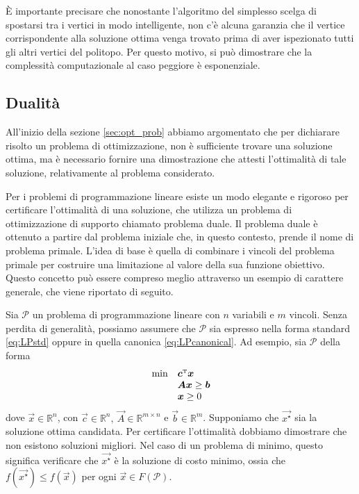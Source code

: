 \`E importante precisare che nonostante l'algoritmo del simplesso scelga di spostarsi tra i vertici in modo
intelligente, non c'è alcuna garanzia che il vertice corrispondente alla soluzione ottima venga trovato prima di aver
ispezionato tutti gli altri vertici del politopo. Per questo motivo, si può dimostrare che la complessità computazionale
al caso peggiore è esponenziale.

\subsection{Dualità}\label{sec:lpduality}
All'inizio della sezione \ref{sec:opt_prob} abbiamo argomentato che per dichiarare risolto un problema di
ottimizzazione, non è sufficiente trovare una soluzione ottima, ma è necessario fornire una dimostrazione
che attesti l'ottimalità di tale soluzione, relativamente al problema considerato.

Per i problemi di programmazione lineare esiste un modo elegante e rigoroso per certificare l'ottimalità di una
soluzione, che utilizza un problema di ottimizzazione di supporto chiamato problema duale. Il problema duale è ottenuto
a partire dal problema iniziale che, in questo contesto, prende il nome di problema primale. L'idea di base è quella di
combinare i vincoli del problema primale per costruire una limitazione al valore della sua funzione obiettivo. Questo
concetto può essere compreso meglio attraverso un esempio di carattere generale, che viene riportato di seguito.

Sia $\mathcal{P}$ un problema di programmazione lineare con $n$ variabili e
$m$ vincoli. Senza perdita di generalità, possiamo assumere che
$\mathcal{P}$ sia espresso nella forma standard \eqref{eq:LPstd} oppure in
quella canonica \eqref{eq:LPcanonical}. Ad esempio, sia $\mathcal{P}$ della
forma
\begin{equation}\label{eq:canonicalduality}
    \begin{array}{ll}
        \,\min & \bm{c}^{\scriptscriptstyle\mathrm{T}} \bm{x} \\
               & \bm{A} \bm{x} \ge \bm{b} \\
             & \bm{x} \ge 0
    \end{array}\\[5pt]
\end{equation}
dove $\vec{x} \in \mathbb{R}^n$, con $\vec{c} \in \mathbb{R}^n,\ \vec{A} \in \mathbb{R}^{m \times n}$ e $\vec{b} \in
\mathbb{R}^m$. Supponiamo che \( \vec{x^{\star}} \) sia la soluzione ottima candidata. Per certificare l'ottimalità
dobbiamo dimostrare che non esistono soluzioni migliori. Nel caso di un problema di minimo, questo significa verificare
che \( \vec{x^{\star}} \) è la soluzione di costo minimo, ossia che \( f(\vec{x^{\star}}) \leq f(\vec{x}) \) per ogni \(
\vec{x} \in F(\mathcal{P}) \).

